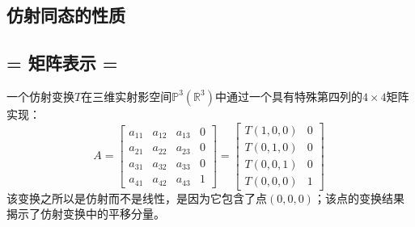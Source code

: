 \subsection{仿射同态的性质}
\subsection{= 矩阵表示 =}
一个仿射变换$T$在三维实射影空间$\mathbb{P}^3(\mathbb{R}^3)$中通过一个具有特殊第四列的$4 \times 4$矩阵实现：
$$
A =
\begin{bmatrix}
a_{11} & a_{12} & a_{13} & 0 \\
a_{21} & a_{22} & a_{23} & 0 \\
a_{31} & a_{32} & a_{33} & 0 \\
a_{41} & a_{42} & a_{43} & 1
\end{bmatrix}
=
\begin{bmatrix}
T(1,0,0) & 0 \\
T(0,1,0) & 0 \\
T(0,0,1) & 0 \\
T(0,0,0) & 1
\end{bmatrix}~
$$
该变换之所以是仿射而不是线性，是因为它包含了点$(0,0,0)$；该点的变换结果揭示了仿射变换中的平移分量。
